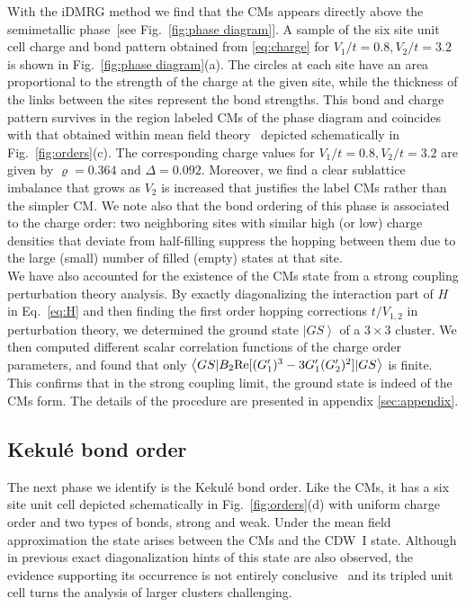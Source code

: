 \documentclass[aps,prx,10pt,twocolumn,floatfix,superscriptaddress,showpacs,numerical,footinbib]{revtex4-1}
\begin{document}
%
With the iDMRG method we find that the CMs appears directly above the semimetallic phase~[see Fig.~\ref{fig:phase diagram}].
%
A sample of the six site unit cell charge and bond pattern obtained from \eqref{eq:charge} for $V_1/t = 0.8, V_2/t = 3.2 $ is shown in Fig.~\ref{fig:phase diagram}(a).
%
The circles at each site have an area proportional to the strength of the charge at the given site, while the thickness of the links between the sites represent the bond strengths.
%
This bond and charge pattern survives in the region labeled CMs of the phase diagram and coincides with that obtained within mean field theory~\cite{GCC13} depicted schematically in Fig.~\ref{fig:orders}(c).
%
The corresponding charge values for $V_1/t = 0.8, V_2/t = 3.2 $ are given by $\varrho=0.364$ and $\Delta = 0.092$.
%
Moreover, we find a clear sublattice imbalance that grows as $V_{2}$ is increased that justifies the label CMs rather than the simpler CM.
%
We note also that the bond ordering of this phase is associated to the charge order: two neighboring sites with similar high (or low) charge densities
that deviate from half-filling suppress the hopping between them due to the large (small) number of filled (empty) states at that site. 
\\
% 
We have also accounted for the existence of the CMs state from a strong coupling perturbation theory analysis. 
%
By exactly diagonalizing the interaction part of $H$ in Eq.~\eqref{eq:H} and then finding the first order hopping corrections $t/V_{1,2}$ in perturbation theory, 
we determined the ground state $\left.|GS\right>$ of a $3\times3$ cluster. 
%
We then computed different scalar correlation functions of the charge order parameters, and found that only $\left<GS|B_2 {\rm Re}[(G_1')^3-3G_1'(G_2')^2]|GS\right>$ is finite. 
%
This confirms that in the strong coupling limit, the ground state is indeed of the CMs form. The details of the procedure are presented in appendix \ref{sec:appendix}. 
%

\subsection{Kekul\'{e} bond order}
%
The next phase we identify is the Kekul\'{e}
bond order.
%
Like the CMs, it has a six site unit cell depicted schematically in Fig.~\ref{fig:orders}(d)
with uniform charge order and two types of bonds, strong and weak.
%
Under the mean field approximation the state arises between the CMs and the CDW~I state.
%
Although in previous exact diagonalization hints of this state are also observed,
the evidence supporting its occurrence is not entirely conclusive~\cite{GGNVC13} and
its tripled unit cell turns the analysis of larger clusters challenging.
%
\end{document}
